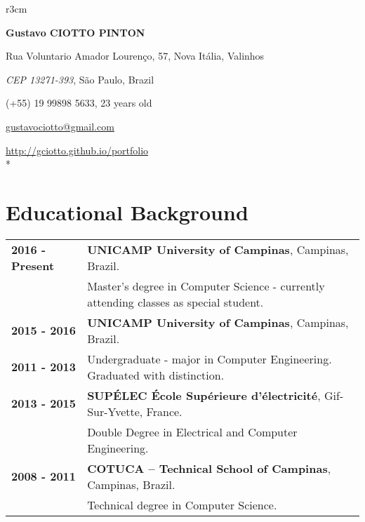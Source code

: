 \documentclass[10pt, a4paper]{article}
\author{Gustavo Ciotto Pinton}
\begin{document}
\pagestyle{empty} 

\begin{wrapfigure}{r}{3cm}
  \vspace{-20pt}
  \begin{center}
  \end{center}
\end{wrapfigure}

\textbf{\LARGE Gustavo CIOTTO PINTON}

Rua Voluntario Amador Lourenço, 57, Nova Itália, Valinhos

\textit{CEP 13271-393}, São Paulo, Brazil

(+55) 19 99898 5633, 23 years old

\url{gustavociotto@gmail.com} 

\url{http://gciotto.github.io/portfolio}\\*



\section{Educational Background}

\begin{tabular}{p{} p{}}

\textbf{2016 - Present} & \textbf{UNICAMP University of
 Campinas}, Campinas, Brazil.
\\
& Master's degree in Computer Science - currently attending classes as special
student. \vspace{4pt}\\

 \textbf{2015 - 2016} & \textbf{UNICAMP University of
 Campinas}, Campinas, Brazil.
 \\
 \textbf{2011 - 2013} & Undergraduate -  major in
 Computer Engineering. Graduated with distinction.\vspace{4pt}
 \\ 

 \textbf{2013 - 2015} & \textbf{SUPÉLEC  École Supérieure d'électricité},
 Gif-Sur-Yvette, France. \\
 & Double Degree in Electrical and Computer Engineering. \vspace{4pt}\\

 
 \textbf{2008 - 2011} & \textbf{COTUCA – Technical School of Campinas},
 Campinas, Brazil. \\
 & Technical degree in Computer Science. \\
\end{tabular}
\end{document}

